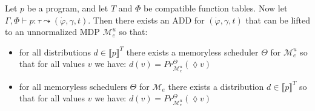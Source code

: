 \begin{lemma}\label{UnnormalizedCorrespondencePrograms}
	Let $p$ be a \NDICE program, and let $T$ and $\Phi$ be compatible function tables. 
	Now let $\Gamma, \Phi \vdash p \colon \tau \leadsto (\dot{\varphi}, \gamma, t)$. Then there exists an ADD for $(\dot{\varphi}, \gamma, t)$ that can be lifted to an unnormalized MDP $\mathcal{M}^u_e$ so that:
	\begin{itemize}
		\item for all distributions $d \in \llbracket p \rrbracket^T$ there exists a memoryless scheduler $\Theta$ for $\mathcal{M}^u_e$ so that for all values $v$ we have: $d(v) = Pr^\Theta_{\mathcal{M}^u_e}(\lozenge v)$
		\item for all memoryless schedulers $\Theta$ for $\mathcal{M}_e$ there exists a distribution $d \in \llbracket p \rrbracket^T$ so that for all values $v$ we have: $d(v) = Pr^\Theta_{\mathcal{M}^u_e}(\lozenge v)$
	\end{itemize} 
\end{lemma}

